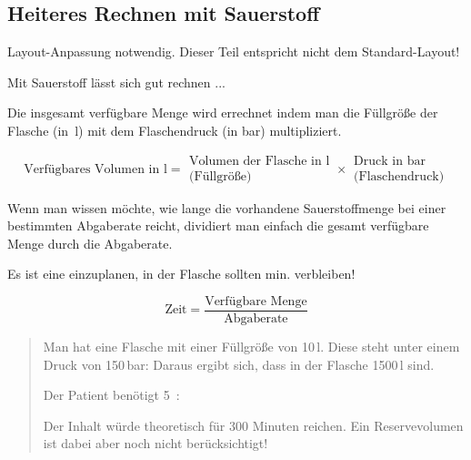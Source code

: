 \subsection{Heiteres Rechnen mit Sauerstoff}
\begin{anfxwarning}[author=GABS]{Layout-Anpassung notwendig.}
   Dieser Teil entspricht nicht dem Standard-Layout!
\end{anfxwarning}

Mit Sauerstoff lässt sich gut rechnen ...

Die insgesamt verfügbare Menge wird errechnet indem man
die Füllgröße der Flasche (in~l) mit dem
Flaschendruck (in bar) multipliziert.

\begin{equation}
\mbox{Verfügbares Volumen in l} = {\begin{array}{c}
\mbox{Volumen der Flasche in l}\\
\mbox{(Füllgröße)} \end{array}}
\times 
\begin{array}{c}{\mbox{Druck in bar}}\\
\mbox{(Flaschendruck)}
\end{array}
\end{equation}




Wenn man wissen möchte, wie lange die vorhandene Sauerstoffmenge bei
einer bestimmten Abgaberate reicht, dividiert man einfach
die gesamt verfügbare Menge durch die Abgaberate. 

 Es ist eine 
einzuplanen, in der Flasche sollten min.  verbleiben! 


\begin{equation}
\mbox{Zeit} = \frac{\mbox{Verfügbare
Menge}}{\mbox{Abgaberate}}
\end{equation}





\begin{quote}
Man hat eine Flasche mit einer Füllgröße von 10\,l. Diese
steht unter einem Druck von 150\,bar: Daraus ergibt
sich, dass in der Flasche 1500\,l  sind.

Der Patient benötigt 5\,  : 

Der Inhalt würde theoretisch für 300 Minuten reichen. Ein
Reservevolumen ist dabei aber noch nicht berücksichtigt!
\end{quote}



